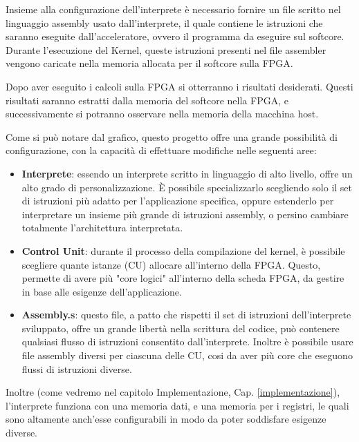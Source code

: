 Insieme alla configurazione dell'interprete è necessario fornire un file scritto nel linguaggio assembly usato dall'interprete, il quale contiene le istruzioni che saranno eseguite dall'acceleratore, ovvero il programma da eseguire sul softcore. Durante l'esecuzione del Kernel, queste istruzioni presenti nel file assembler vengono caricate nella memoria allocata per il softcore sulla FPGA.

Dopo aver eseguito i calcoli sulla FPGA si otterranno i risultati desiderati. Questi risultati saranno estratti dalla memoria del softcore nella FPGA, e successivamente si potranno osservare nella memoria della macchina host.

\vspace{1cm}

Come si può notare dal grafico, questo progetto offre una grande possibilità di configurazione, con la capacità di effettuare modifiche nelle seguenti aree: 

\begin{itemize}
    \item \textbf{Interprete}: essendo un interprete scritto in linguaggio di alto livello, offre un alto grado di personalizzazione. È possibile specializzarlo scegliendo solo il set di istruzioni più adatto per l'applicazione specifica, oppure estenderlo per interpretare un insieme più grande di istruzioni assembly, o persino cambiare totalmente l'architettura interpretata.
    \item \textbf{Control Unit}: durante il processo della compilazione del kernel, è possibile scegliere quante istanze (CU) allocare all'interno della FPGA. Questo, permette di avere più "core logici" all'interno della scheda FPGA, da gestire in base alle esigenze dell'applicazione.
    \item \textbf{Assembly.s}: questo file, a patto che rispetti il set di istruzioni dell'interprete sviluppato, offre un grande libertà nella scrittura del codice, può contenere qualsiasi flusso di istruzioni consentito dall'interprete. Inoltre è possibile usare file assembly diversi per ciascuna delle CU, cosi da aver più core che eseguono flussi di istruzioni diverse. 
\end{itemize}

\vspace{1cm}

Inoltre (come vedremo nel capitolo Implementazione, Cap. \ref{implementazione}), l'interprete funziona con una memoria dati, e una memoria per i registri, le quali sono altamente anch'esse configurabili in modo da poter soddisfare esigenze diverse.

